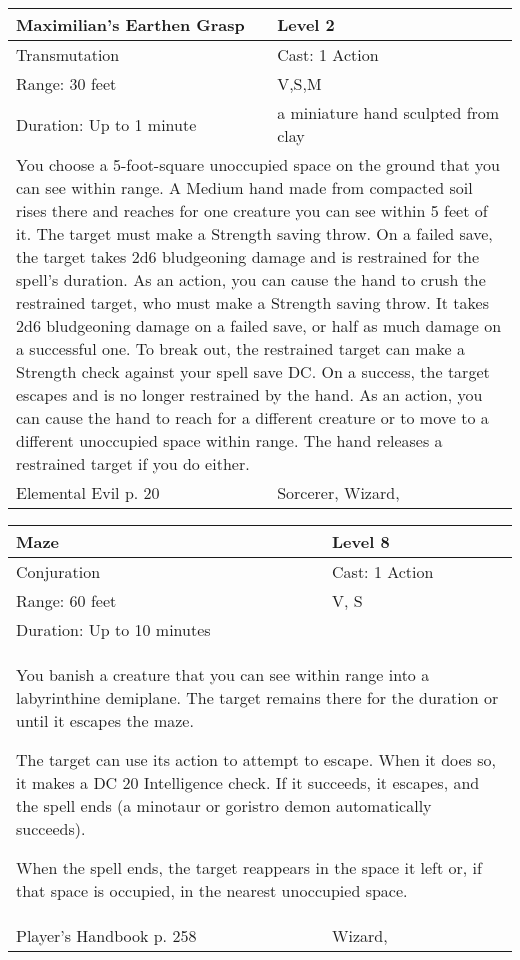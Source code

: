 \documentclass[11pt]{report}
\begin{document}
\begin{table}[H]
	\begin{tabular}{||p{6cm}|p{6cm}||}
		\hline\hline
		\bf{Maximilian’s Earthen Grasp} & Level 2\\ \hline
		Transmutation & Cast: 1 Action\\ \hline
		Range: 30 feet & V,S,M\\ \hline
		Duration: Up to 1 minute & a miniature hand sculpted from clay\\ \hline
		\multicolumn{2}{||p{12cm}||}{You choose a 5-foot-square unoccupied space on the ground that you can see within range. A Medium hand made from compacted soil rises there and reaches
for one creature you can see within 5 feet of it. The target must make a Strength saving throw. On a failed save, the target takes 2d6 bludgeoning damage and is restrained for the spell’s duration.
As an action, you can cause the hand to crush the restrained target, who must make a Strength saving throw. It takes 2d6 bludgeoning damage on a failed save, or half as much damage on a successful one.
To break out, the restrained target can make a Strength check against your spell save DC. On a success, the target escapes and is no longer restrained by the hand.
As an action, you can cause the hand to reach for a different creature or to move to a different unoccupied space within range. The hand releases a restrained target if you do either.}\\ \hline
Elemental Evil p. 20 & Sorcerer, Wizard, \\ \hline\hline
	\end{tabular}
\end{table}

\begin{table}[H]
	\begin{tabular}{||p{6cm}|p{6cm}||}
		\hline\hline
		\bf{Maze} & Level 8\\ \hline
		Conjuration & Cast: 1 Action\\ \hline
		Range: 60 feet & V, S\\ \hline
		Duration: Up to 10 minutes & \\ \hline
		\multicolumn{2}{||p{12cm}||}{You banish a creature that you can see within range into a labyrinthine demiplane. The target remains there for the duration or until it escapes the maze.

The target can use its action to attempt to escape. When it does so, it makes a DC 20 Intelligence check. If it succeeds, it escapes, and the spell ends (a minotaur or goristro demon automatically succeeds).

When the spell ends, the target reappears in the space it left or, if that space is occupied, in the nearest unoccupied space.}\\ \hline
Player's Handbook p. 258 & Wizard, \\ \hline\hline
	\end{tabular}
\end{table}
\end{document}
